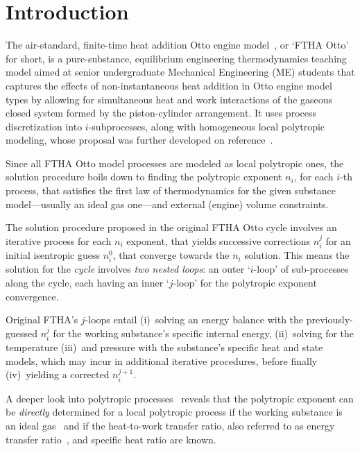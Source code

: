 \section{Introduction}

    The air-standard, finite-time heat addition Otto engine model~\cite{2017-NaaktgeborenC-IntJMechEngEduc}, or `FTHA Otto'  for
    short, is a pure-substance, equilibrium engineering thermodynamics teaching model aimed at senior  undergraduate  Mechanical
    Engineering (ME) students that captures the effects of non-instantaneous  heat  addition  in  Otto  engine  model  types  by
    allowing for simultaneous heat and work interactions of the gaseous closed system formed by the piston-cylinder arrangement.
    It uses process discretization into $i$-subprocesses, along with homogeneous local polytropic modeling, whose  proposal  was
    further developed on reference~\cite{2020-NaaktgeborenC-Polytropic-engrXiv-rev02}.

    Since all FTHA Otto model processes are modeled as local polytropic ones, the solution procedure boils down to  finding  the
    polytropic exponent $n_i$, for each $i$-th process, that satisfies the first law of thermodynamics for the  given  substance
    model---usually an ideal gas one---and external (engine) volume constraints.

    The solution procedure proposed in the original FTHA Otto cycle involves an iterative process for each $n_i$ exponent,  that
    yields successive corrections $n_i^j$ for an initial isentropic guess $n_i^0$, that converge  towards  the  $n_i$  solution.
    This means the solution for the \emph{cycle} involves \emph{two nested loops}: an outer `$i$-loop'  of  sub-processes  along
    the cycle, each having an inner `$j$-loop' for the polytropic exponent convergence.

    Original FTHA's $j$-loops entail (i)~solving  an  energy  balance  with  the  previously-guessed  $n_i^j$  for  the  working
    substance's specific internal energy, (ii)~solving for the temperature (iii)~and pressure with the substance's specific heat
    and state models, which may incur in additional iterative procedures, before finally (iv)~yielding a corrected $n_i^{j+1}$.

    A deeper look into polytropic processes~\cite{2012-ChristiansJ-IntJMechEngEduc, 2020-NaaktgeborenC-Polytropic-engrXiv-rev02}
    reveals that the polytropic exponent can be \emph{directly} determined  for  a  local  polytropic  process  if  the  working
    substance is an ideal gas~\cite{2020-NaaktgeborenC-Polytropic-engrXiv-rev02} and if the heat-to-work  transfer  ratio,  also
    referred to as energy transfer ratio~\cite{2012-ChristiansJ-IntJMechEngEduc}, and specific heat ratio are known.

